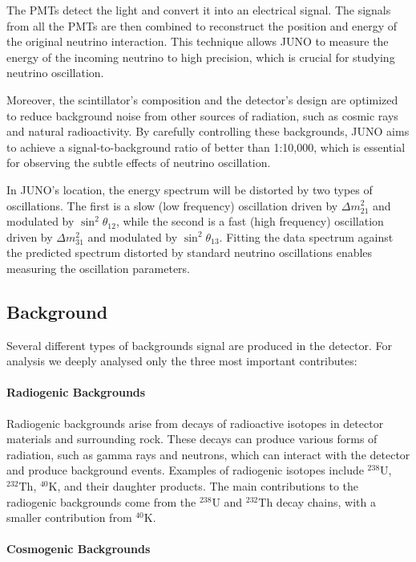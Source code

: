 The PMTs detect the light and convert it into an electrical signal. The signals from all the PMTs are then combined to reconstruct the position and energy of the original neutrino interaction. This technique allows JUNO to measure the energy of the incoming neutrino to high precision, which is crucial for studying neutrino oscillation.

Moreover, the scintillator's composition and the detector's design are optimized to reduce background noise from other sources of radiation, such as cosmic rays and natural radioactivity. By carefully controlling these backgrounds, JUNO aims to achieve a signal-to-background ratio of better than 1:10,000, which is essential for observing the subtle effects of neutrino oscillation.

In JUNO's location, the energy spectrum will be distorted by two types of oscillations. The first is a slow (low frequency) oscillation driven by $\Delta m_{21}^2$ and modulated by $\sin ^2 \theta_{12}$, while the second is a fast (high frequency) oscillation driven by $\Delta m_{31}^2$ and modulated by $\sin ^2 \theta_{13}$. Fitting the data spectrum against the predicted spectrum distorted by standard neutrino oscillations enables measuring the oscillation parameters.\\
\subsection{Background}
Several different types of backgrounds signal are produced in the detector. For analysis we deeply analysed only the three most important contributes:


\paragraph{Radiogenic Backgrounds}

Radiogenic backgrounds arise from decays of radioactive isotopes in detector materials and surrounding rock. These decays can produce various forms of radiation, such as gamma rays and neutrons, which can interact with the detector and produce background events. Examples of radiogenic isotopes include $^{238}\mathrm{U}$, $^{232}\mathrm{Th}$, $^{40}\mathrm{K}$, and their daughter products. The main contributions to the radiogenic backgrounds come from the $^{238}\mathrm{U}$ and $^{232}\mathrm{Th}$ decay chains, with a smaller contribution from $^{40}\mathrm{K}$.

\paragraph{Cosmogenic Backgrounds}

